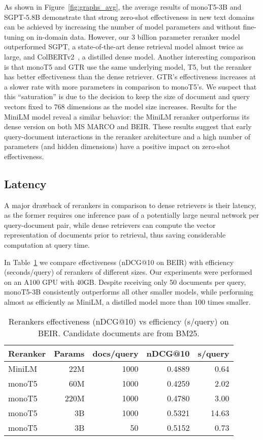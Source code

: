 \documentclass[sigconf,nonacm]{acmart}
\begin{document}
As shown in Figure~\ref{fig:graphs_avg}, the average results of monoT5-3B and SGPT-5.8B demonstrate that strong zero-shot effectiveness in new text domains can be achieved by increasing the number of model parameters and without fine-tuning on in-domain data. However, our 3 billion parameter reranker model outperformed SGPT, a state-of-the-art dense retrieval model almost twice as large, and ColBERTv2~\cite{santhanam2021colbertv2}, a distilled dense model.
Another interesting comparison is that monoT5 and GTR use the same underlying model, T5, but the reranker has better effectiveness than the dense retriever. GTR's effectiveness increases at a slower rate with more parameters in comparison to monoT5's. We suspect that this ``saturation'' is due to the decision to keep the size of document and query vectors fixed to 768 dimensions as the model size increases. Results for the MiniLM model reveal a similar behavior: the MiniLM reranker outperforms its dense version on both MS MARCO and BEIR.
These results suggest that early query-document interactions in the reranker architecture and a high number of parameters (and hidden dimensions) have a positive impact on zero-shot effectiveness.

\subsection{Latency}

A major drawback of rerankers in comparison to dense retrievers is their latency, as the former requires one inference pass of a potentially large neural network per query-document pair, while dense retrievers can compute the vector representation of documents prior to retrieval, thus saving considerable computation at query time.

In Table~\ref{tab:latency} we compare effectiveness (nDCG@10 on BEIR) with efficiency (seconds/query) of rerankers of different sizes. Our experiments were performed on an A100 GPU with 40GB. Despite receiving only 50 documents per query, monoT5-3B consistently outperforms all other smaller models, while performing almost as efficiently as MiniLM, a distilled model more than 100 times smaller. 


\begin{table}[]
\centering \begin{tabular}{lrrrr}
\toprule
\textbf{Reranker} & \textbf{Params} & \textbf{docs/query} & \textbf{nDCG@10} & \textbf{s/query} \\
\midrule
MiniLM & 22M & 1000 & 0.4889 & 0.64 \\
monoT5 & 60M & 1000 & 0.4259 & 2.02 \\
monoT5 & 220M & 1000 & 0.4780 & 3.00 \\
monoT5 & 3B & 1000 & 0.5321 & 14.63 \\
monoT5 & 3B & 50 & 0.5152 & 0.73 \\
\bottomrule
\end{tabular}
\caption{Rerankers effectiveness (nDCG@10) vs efficiency (s/query) on BEIR. Candidate documents are from BM25.}
\label{tab:latency}
\end{table}
\end{document}
